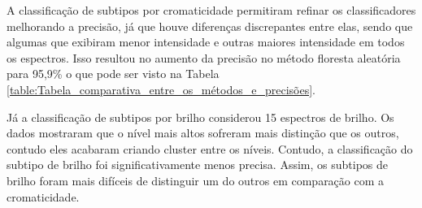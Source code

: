 A classificação de subtipos por cromaticidade permitiram refinar os classificadores melhorando a precisão, já que houve diferenças discrepantes entre elas, sendo que algumas que exibiram menor intensidade e outras maiores intensidade em todos os espectros. Isso resultou no aumento da precisão no método floresta aleatória para 95,9\% o que pode ser visto na Tabela \ref{table:Tabela_comparativa_entre_os_métodos_e_precisões}.

Já a classificação de subtipos por brilho considerou 15 espectros de brilho. Os dados mostraram que o nível mais altos sofreram mais distinção que os outros, contudo eles acabaram criando cluster entre os níveis. Contudo, a classificação do subtipo de brilho foi significativamente menos precisa. Assim, os subtipos de brilho foram mais difíceis de distinguir um do outros em comparação com a cromaticidade.


\begin{table}[]
\centering
\caption{Tabela comparativa entre os métodos e precisões}
\label{table:Tabela_comparativa_entre_os_métodos_e_precisões}\textbf{}
\end{table}



